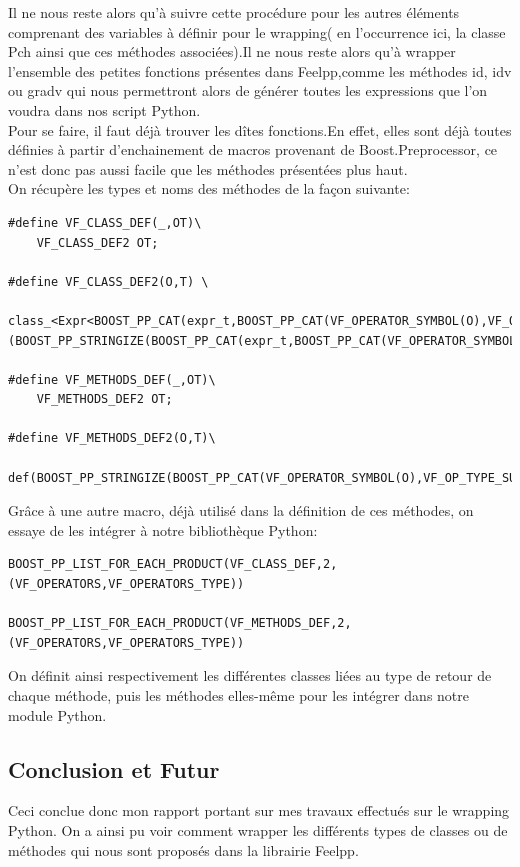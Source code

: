 \documentclass[french,12pt]{article}
\begin{document}
Il ne nous reste alors qu'à suivre cette procédure pour les autres éléments comprenant des variables à définir pour le wrapping( en l'occurrence ici, la classe Pch ainsi que ces méthodes associées).Il ne nous reste alors qu'à wrapper l'ensemble des petites fonctions présentes dans Feelpp,comme les méthodes id, idv ou gradv qui nous permettront alors de générer toutes les expressions que l'on voudra dans nos script Python.\\

Pour se faire, il faut déjà trouver les dîtes fonctions.En effet, elles sont déjà toutes définies à partir d'enchainement de macros provenant de Boost.Preprocessor, ce n'est donc pas aussi facile que les méthodes présentées plus haut.\\
On récupère les types et noms des méthodes de la façon suivante:
\begin{lstlisting}
#define VF_CLASS_DEF(_,OT)\
    VF_CLASS_DEF2 OT;

#define VF_CLASS_DEF2(O,T) \
     class_<Expr<BOOST_PP_CAT(expr_t,BOOST_PP_CAT(VF_OPERATOR_SYMBOL(O),VF_OP_TYPE_SUFFIX(T)))>>(BOOST_PP_STRINGIZE(BOOST_PP_CAT(expr_t,BOOST_PP_CAT(VF_OPERATOR_SYMBOL(O),VF_OP_TYPE_SUFFIX(T)))),no_init)

#define VF_METHODS_DEF(_,OT)\
    VF_METHODS_DEF2 OT;
    
#define VF_METHODS_DEF2(O,T)\
    def(BOOST_PP_STRINGIZE(BOOST_PP_CAT(VF_OPERATOR_SYMBOL(O),VF_OP_TYPE_SUFFIX(T))),Feel::vf::BOOST_PP_CAT(VF_OPERATOR_SYMBOL(O),VF_OP_TYPE_SUFFIX(T)))       
\end{lstlisting}

Grâce à une autre macro, déjà utilisé dans la définition de ces méthodes, on essaye de les intégrer à notre bibliothèque Python:
\begin{lstlisting}
BOOST_PP_LIST_FOR_EACH_PRODUCT(VF_CLASS_DEF,2,(VF_OPERATORS,VF_OPERATORS_TYPE))

BOOST_PP_LIST_FOR_EACH_PRODUCT(VF_METHODS_DEF,2,(VF_OPERATORS,VF_OPERATORS_TYPE))
\end{lstlisting}

On définit ainsi respectivement les différentes classes liées au type de retour de chaque méthode, puis les méthodes elles-même pour les intégrer dans notre module Python.

\subsection{Conclusion et Futur}
Ceci conclue donc mon rapport portant sur mes travaux effectués sur le wrapping Python. On a ainsi pu voir comment wrapper les différents types de classes ou de méthodes qui nous sont proposés dans la librairie Feelpp.\\
\end{document}
